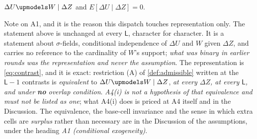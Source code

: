 \begin{assumption}\label{ass:condind}
$\Delta U \upmodels W \mid \Delta Z$ and $E[\Delta U \mid \Delta Z] = 0$.
\end{assumption}

\noindent Note on A1, and it is the reason this dispatch touches representation only. The
statement above is unchanged at every $\mathsf L$, character for character. It is a statement about
$\sigma$-fields, conditional independence of $\Delta U$ and $W$ given $\Delta Z$, and carries no
reference to the cardinality of $W$'s support; \emph{what was binary in earlier rounds was the
representation and never the assumption}. The representation is \eqref{eq:contrast}, and it is exact:
restriction (A) of \cref{def:admissible} written at the
$\mathsf L-1$ contrasts is \emph{equivalent} to $\Delta U\upmodels W\mid\Delta Z$, \emph{at every
$\Delta Z$, at every $\mathsf L$, and under \textbf{no} overlap condition}. \emph{A4(i) is not a
hypothesis of that equivalence and must not be listed as one}; what A4(i) does is priced at A4 itself
and in the Discussion. The equivalence, the
base-cell invariance and the sense in which
extra cells are \emph{surplus} rather than necessary are in the Discussion of the assumptions, under the
heading \emph{A1 (conditional exogeneity)}.

%

